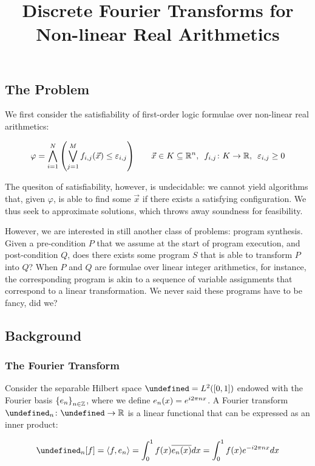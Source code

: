 \documentclass[12pt]{article}
\author{}
\title{Discrete Fourier Transforms for Non-linear Real Arithmetics}
\date{}
\let\H\undefined
\newcommand{\H}{\mathcal{H}}
\let\F\undefined
\newcommand{\F}{\mathcal{F}}
\begin{document}
\maketitle

\subsection{The Problem}
We first consider the satisfiability of first-order logic formulae over
non-linear real arithmetics:

\begin{align*}
  \varphi
    = \bigwedge_{i = 1}^{N} {\left(\bigvee_{j = 1}^{M}
        f_{i, j}{\left(\vec{x}\right)} \leq \varepsilon_{i, j}\right)}
  \qquad
  \vec{x} \in K \subseteq {\mathbb{R}}^n, \enskip
  {f_{i, j} \colon K \to {\mathbb{R}}}, \enskip
  \varepsilon_{i, j} \geq 0
\end{align*}

The quesiton of satisfiability, however, is undecidable:
we cannot yield algorithms that, given $\varphi$, is able to find some
$\vec{x}$ if there exists a satisfying configuration.
We thus seek to approximate solutions, which throws away soundness for
feasibility.

However, we are interested in still another class of problems:
program synthesis.
Given a pre-condition $P$ that we assume at the start of program execution,
and post-condition $Q$, does there exists some program $S$ that is able to
transform $P$ into $Q$?
When $P$ and $Q$ are formulae over linear integer arithmetics, for instance,
the corresponding program is akin to a sequence of variable assignments
that correspond to a linear transformation.
We never said these programs have to be fancy, did we?


\subsection{Background}
\subsubsection{The Fourier Transform}
Consider the separable Hilbert space $\H = L^2 \parens{\brackets{0, 1}}$
endowed with the Fourier basis ${\left\{e_n\right\}}_{n \in {\mathbb{Z}}}$, where we define
$e_n {\left(x\right)} = e^{i 2\pi n x}$.
A Fourier transform $\type{\F_n}{\H}{\R}$ is a linear functional that can
be expressed as an inner product:

\begin{align*}
  \F_n\brackets{f}
    = \inner{f, e_n}
    = \int_0^1 f\parens{x} \overline{e_n \parens{x}} dx
    = \int_0^1 f\parens{x} e^{-i 2 \pi n x} dx
\end{align*}
\end{document}

